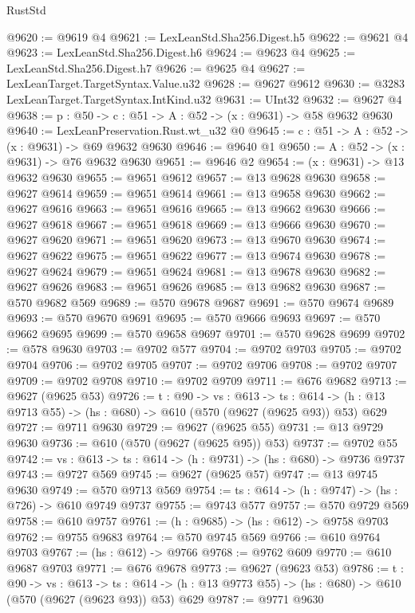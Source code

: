 \begin{lexlean}{RustStd}
\begin{coremodule}
@9620 := @9619 @4
@9621 := LexLeanStd.Sha256.Digest.h5
@9622 := @9621 @4
@9623 := LexLeanStd.Sha256.Digest.h6
@9624 := @9623 @4
@9625 := LexLeanStd.Sha256.Digest.h7
@9626 := @9625 @4
@9627 := LexLeanTarget.TargetSyntax.Value.u32
@9628 := @9627 @9612
@9630 := @3283 LexLeanTarget.TargetSyntax.IntKind.u32
@9631 := UInt32
@9632 := @9627 @4
@9638 := {p : @50} -> {c : @51} -> {A : @52} -> (x : @9631) -> @58 @9632 @9630
@9640 := LexLeanPreservation.Rust.wt_u32 @0
@9645 := {c : @51} -> {A : @52} -> (x : @9631) -> @69 @9632 @9630
@9646 := @9640 @1
@9650 := {A : @52} -> (x : @9631) -> @76 @9632 @9630
@9651 := @9646 @2
@9654 := (x : @9631) -> @13 @9632 @9630
@9655 := @9651 @9612
@9657 := @13 @9628 @9630
@9658 := @9627 @9614
@9659 := @9651 @9614
@9661 := @13 @9658 @9630
@9662 := @9627 @9616
@9663 := @9651 @9616
@9665 := @13 @9662 @9630
@9666 := @9627 @9618
@9667 := @9651 @9618
@9669 := @13 @9666 @9630
@9670 := @9627 @9620
@9671 := @9651 @9620
@9673 := @13 @9670 @9630
@9674 := @9627 @9622
@9675 := @9651 @9622
@9677 := @13 @9674 @9630
@9678 := @9627 @9624
@9679 := @9651 @9624
@9681 := @13 @9678 @9630
@9682 := @9627 @9626
@9683 := @9651 @9626
@9685 := @13 @9682 @9630
@9687 := @570 @9682 @569
@9689 := @570 @9678 @9687
@9691 := @570 @9674 @9689
@9693 := @570 @9670 @9691
@9695 := @570 @9666 @9693
@9697 := @570 @9662 @9695
@9699 := @570 @9658 @9697
@9701 := @570 @9628 @9699
@9702 := @578 @9630
@9703 := @9702 @577
@9704 := @9702 @9703
@9705 := @9702 @9704
@9706 := @9702 @9705
@9707 := @9702 @9706
@9708 := @9702 @9707
@9709 := @9702 @9708
@9710 := @9702 @9709
@9711 := @676 @9682
@9713 := @9627 (@9625 @53)
@9726 := {t : @90} ->
  {vs : @613} ->
  {ts : @614} -> (h : @13 @9713 @55) -> (hs : @680) -> @610 (@570 (@9627 (@9625 @93)) @53) @629
@9727 := @9711 @9630
@9729 := @9627 (@9625 @55)
@9731 := @13 @9729 @9630
@9736 := @610 (@570 (@9627 (@9625 @95)) @53)
@9737 := @9702 @55
@9742 := {vs : @613} -> {ts : @614} -> (h : @9731) -> (hs : @680) -> @9736 @9737
@9743 := @9727 @569
@9745 := @9627 (@9625 @57)
@9747 := @13 @9745 @9630
@9749 := @570 @9713 @569
@9754 := {ts : @614} -> (h : @9747) -> (hs : @726) -> @610 @9749 @9737
@9755 := @9743 @577
@9757 := @570 @9729 @569
@9758 := @610 @9757
@9761 := (h : @9685) -> (hs : @612) -> @9758 @9703
@9762 := @9755 @9683
@9764 := @570 @9745 @569
@9766 := @610 @9764 @9703
@9767 := (hs : @612) -> @9766
@9768 := @9762 @609
@9770 := @610 @9687 @9703
@9771 := @676 @9678
@9773 := @9627 (@9623 @53)
@9786 := {t : @90} ->
  {vs : @613} ->
  {ts : @614} -> (h : @13 @9773 @55) -> (hs : @680) -> @610 (@570 (@9627 (@9623 @93)) @53) @629
@9787 := @9771 @9630

\end{coremodule}
\end{lexlean}
